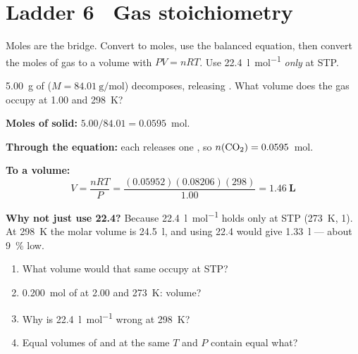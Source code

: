 \documentclass{apchem-worksheet}
\begin{document}
\section*{\sffamily Ladder 6 \textbullet\ Gas stoichiometry}

Moles are the bridge. Convert to moles, use the balanced equation, then
convert the moles of gas to a volume with $PV = nRT$. Use
\SI{22.4}{\litre\per\mole} \emph{only} at STP.

\begin{workedexample}
\SI{5.00}{\gram} of  ($M = \SI{84.01}{\gram\per\mole}$)
decomposes, releasing . What volume does the gas occupy at
\SI{1.00}{\atm} and \SI{298}{\kelvin}?

\textbf{Moles of solid:} $5.00/84.01 = \num{0.0595}$~mol.

\textbf{Through the equation:} each  releases one , so
$n(\ce{CO2}) = \num{0.0595}$~mol.

\textbf{To a volume:}
\[ V = \frac{nRT}{P} = \frac{(0.05952)(0.08206)(298)}{1.00}
   = \mathbf{1.46~L} \]

\textbf{Why not just use 22.4?} Because \SI{22.4}{\litre\per\mole} holds
only at STP (\SI{273}{\kelvin}, \SI{1}{\atm}). At \SI{298}{\kelvin} the
molar volume is \SI{24.5}{\litre}, and using 22.4 would give
\SI{1.33}{\litre} --- about \SI{9}{\percent} low.
\end{workedexample}

\begin{yourturn}
\begin{enumerate}[leftmargin=*,itemsep=0.5em]
  \item What volume would that same  occupy at STP?
        \workspace[1.6cm]
  \item \SI{0.200}{\mole} of  at \SI{2.00}{\atm} and
        \SI{273}{\kelvin}: volume? \workspace[1.6cm]
  \item Why is \SI{22.4}{\litre\per\mole} wrong at \SI{298}{\kelvin}?
        \workspace[1.6cm]
  \item Equal volumes of  and  at the same $T$ and $P$
        contain equal what? \workspace[1.6cm]
\end{enumerate}
\end{yourturn}
\end{document}
